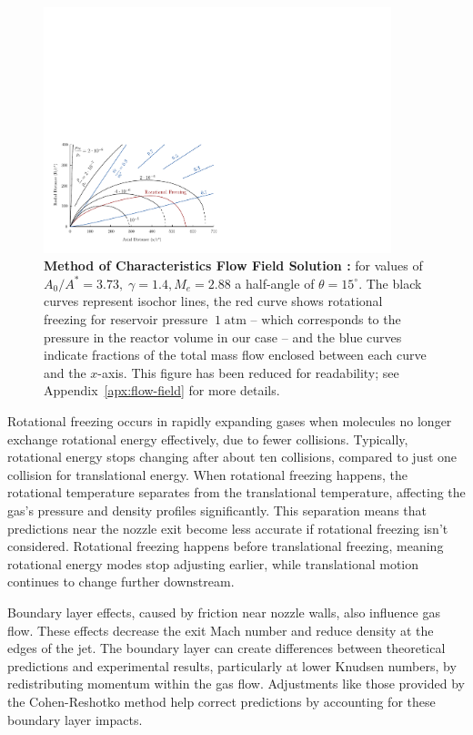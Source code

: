 		\begin{figure}[H]
			\centering
		    \includegraphics[width=0.9\textwidth]{src/03_analytical-work/fig_velocity-distribution-reduced.pdf}
			\caption[Method of Characteristics Flow Field Solution \cite{Cassanova1965}]{
				\textbf{Method of Characteristics Flow Field Solution \cite{Cassanova1965}:}
				for values of $A_0/A^* = 3.73,\;\gamma=1.4,M_e =2.88$ a half-angle of $\theta = 15^\circ$.
				The black curves represent isochor lines, the red curve shows rotational freezing for reservoir pressure $~1\;\text{atm}$ -- which corresponds to the pressure in the reactor volume in our case -- and the blue curves indicate fractions of the total mass flow enclosed between each curve and the $x$-axis. 
				This figure has been reduced for readability; see Appendix~\ref{apx:flow-field} for more details.
			}
			\label{fig:velocity-distribution-reduced}
		\end{figure}

		Rotational freezing occurs in rapidly expanding gases when molecules no longer exchange rotational energy effectively, due to fewer collisions.
		Typically, rotational energy stops changing after about ten collisions, compared to just one collision for translational energy.
		When rotational freezing happens, the rotational temperature separates from the translational temperature, affecting the gas's pressure and density profiles significantly.
		This separation means that predictions near the nozzle exit become less accurate if rotational freezing isn't considered.
		Rotational freezing happens before translational freezing, meaning rotational energy modes stop adjusting earlier, while translational motion continues to change further downstream.

		Boundary layer effects, caused by friction near nozzle walls, also influence gas flow.
		These effects decrease the exit Mach number and reduce density at the edges of the jet.
		The boundary layer can create differences between theoretical predictions and experimental results, particularly at lower Knudsen numbers, by redistributing momentum within the gas flow.
		Adjustments like those provided by the Cohen-Reshotko method help correct predictions by accounting for these boundary layer impacts.

